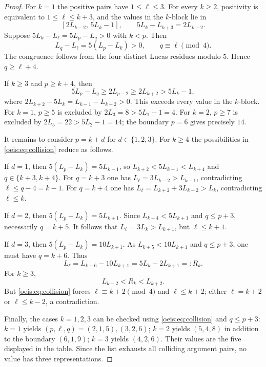 \documentclass[11pt]{article}
\begin{document}
\begin{proof}
For $k=1$ the positive pairs have $1\le\ell\le3$.
For every $k\ge2$, positivity is equivalent to
$1\le\ell\le k+3$, and the values in the $k$-block lie in
\[
[2L_{k-2},\,5L_k-1],
\qquad 5L_k-L_{k+3}=2L_{k-2}.
\]
Suppose $5L_k-L_\ell=5L_p-L_q>0$ with $k<p$.
Then
\begin{equation}\label{oeis:eq:collision}
L_q-L_\ell=5(L_p-L_k)>0,\qquad q\equiv\ell\pmod4.
\end{equation}
The congruence follows from the four distinct Lucas residues modulo $5$.
Hence $q\ge\ell+4$.

If $k\ge3$ and $p\ge k+4$, then
\[
5L_p-L_q\ge2L_{p-2}\ge2L_{k+2}>5L_k-1,
\]
where $2L_{k+2}-5L_k=L_{k-1}-L_{k-2}>0$.
This exceeds every value in the $k$-block.
For $k=1$, $p\ge5$ is excluded by
$2L_3=8>5L_1-1=4$.
For $k=2$, $p\ge7$ is excluded by
$2L_5=22>5L_2-1=14$; the boundary $p=6$
gives precisely $14$.

It remains to consider $p=k+d$ for $d\in\{1,2,3\}$.
For $k\ge4$ the possibilities in \eqref{oeis:eq:collision}
reduce as follows.

If $d=1$, then $5(L_p-L_k)=5L_{k-1}$,
so $L_{k+2}<5L_{k-1}<L_{k+4}$ and
$q\in\{k+3,k+4\}$.
For $q=k+3$ one has
$L_\ell=3L_{k-2}>L_{k-1}$, contradicting
$\ell\le q-4=k-1$.
For $q=k+4$ one has
$L_\ell=L_{k+2}+3L_{k-2}>L_k$,
contradicting $\ell\le k$.

If $d=2$, then $5(L_p-L_k)=5L_{k+1}$.
Since $L_{k+4}<5L_{k+1}$ and $q\le p+3$,
necessarily $q=k+5$.
It follows that
$L_\ell=3L_k>L_{k+1}$, but $\ell\le k+1$.

If $d=3$, then $5(L_p-L_k)=10L_{k+1}$.
As $L_{k+5}<10L_{k+1}$ and $q\le p+3$,
one must have $q=k+6$. Thus
\[
L_\ell=L_{k+6}-10L_{k+1}
=5L_k-2L_{k+1}=:R_k.
\]
For $k\ge3$,
\[
L_{k-2}<R_k<L_{k+2}.
\]
But \eqref{oeis:eq:collision} forces
$\ell\equiv k+2\pmod4$ and $\ell\le k+2$;
either $\ell=k+2$ or $\ell\le k-2$, a contradiction.

Finally, the cases $k=1,2,3$ can be checked using
\eqref{oeis:eq:collision} and $q\le p+3$:
$k=1$ yields $(p,\ell,q)=(2,1,5),(3,2,6)$;
$k=2$ yields $(5,4,8)$ in addition to the
boundary $(6,1,9)$; $k=3$ yields $(4,2,6)$.
Their values are the five displayed in the table.
Since the list exhausts all colliding argument pairs,
no value has three representations.
\end{proof}
\end{document}
